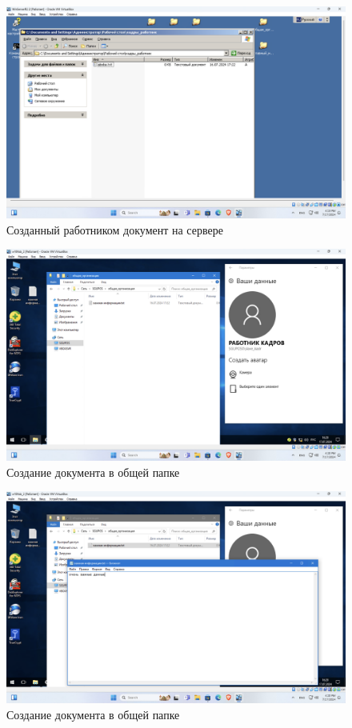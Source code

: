 \begin{figure}[H]
  \centering
  \includegraphics[width=1\textwidth]{pict/prac/30}
  \caption{Созданный работником документ на сервере}
  \label{fig:29}
\end{figure}


\begin{figure}[H]
  \centering
  \includegraphics[width=1\textwidth]{pict/prac/33}
  \caption{Создание документа в общей папке}
  \label{fig:32}
\end{figure}

\begin{figure}[H]
  \centering
  \includegraphics[width=1\textwidth]{pict/prac/34}
  \caption{Создание документа в общей папке}
  \label{fig:33}
\end{figure}

